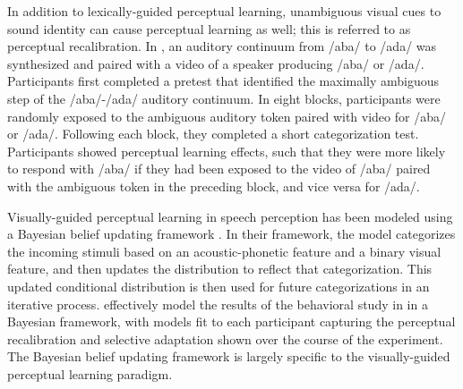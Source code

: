 In addition to lexically-guided perceptual learning, unambiguous visual cues to sound identity can cause perceptual learning as well; this is referred to as perceptual recalibration.
In \citet{Bertelson2003}, an auditory continuum from /aba/ to /ada/ was synthesized and paired with a video of a speaker producing /aba/ or /ada/.  
Participants first completed a pretest that identified the maximally ambiguous step of the /aba/-/ada/ auditory continuum. 
In eight blocks, participants were randomly exposed to the ambiguous auditory token paired with video for /aba/ or /ada/.  Following each block, they completed a short categorization test.  
Participants showed perceptual learning effects, such that they were more likely to respond with /aba/ if they had been exposed to the video of /aba/ paired with the ambiguous token in the preceding block, and vice versa for /ada/.


Visually-guided perceptual learning in speech perception has been modeled using a Bayesian belief updating framework \citep{Kleinschmidt2011}.  
In their framework, the model categorizes the incoming stimuli based on an acoustic-phonetic feature and a binary visual feature, and then updates the distribution to reflect that categorization.
This updated conditional distribution is then used for future categorizations in an iterative process.  
\citet{Kleinschmidt2011} effectively model the results of the behavioral study in \citet{Vroomen2007} in a Bayesian framework, with models fit to each participant capturing the perceptual recalibration and selective adaptation shown over the course of the experiment.
The Bayesian belief updating framework is largely specific to the visually-guided perceptual learning paradigm.

